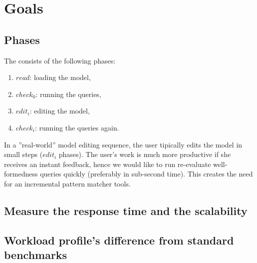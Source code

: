 \section{Goals}





\subsection{Phases}

The \tb{} consists of the following phases:

\begin{enumerate}
  \item $\mathit{read}$: loading the model,
  \item $\mathit{check}_0$: running the queries,
  \item $\mathit{edit}_i$: editing the model, 
  \item $\mathit{check}_i$: running the queries again.
\end{enumerate}

In a ''real-world'' model editing sequence, the user tipically edits the model in small steps ($\mathit{edit}_i$ phases). The user's work is much more productive if she receives an instant feedback, hence we would like to run re-evaluate well-formedness queries quickly (preferably in sub-second time). This creates the need for an incremental pattern matcher tools.

\subsection{Measure the response time and the scalability}

\subsection{Workload profile's difference from standard benchmarks}


